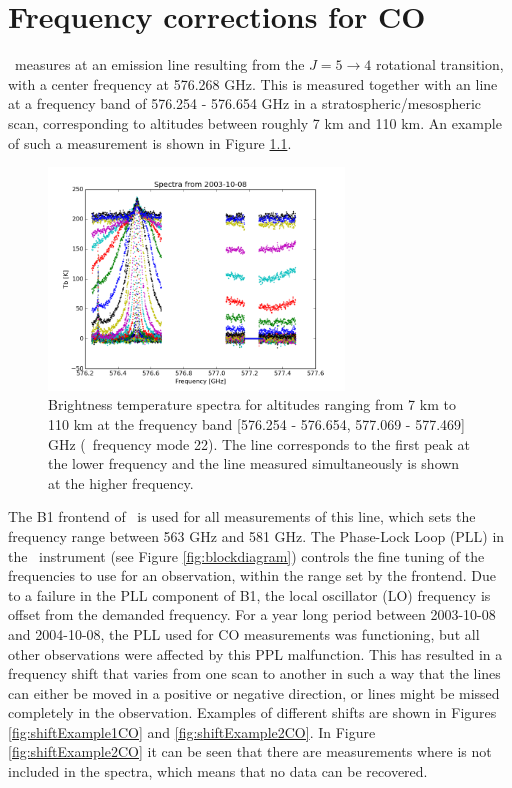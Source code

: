 \chapter{Frequency corrections for CO}
\label{chapter:freqCorrCO}

\smr\ measures  at an emission line resulting from the $J = 5 \rightarrow 4$ rotational transition, with a center frequency at 576.268 GHz. This is measured together with an  line at a frequency band of 576.254 - 576.654 GHz in a stratospheric/mesospheric scan, corresponding to altitudes between roughly 7 km and 110 km. An example of such a measurement is shown in Figure \ref{fig:spectraCO}. 

\begin{figure}[ht!]
\begin{center}
\includegraphics[width=0.7\textwidth]{freq_corr_coExample.png}
\caption{Brightness temperature spectra for altitudes ranging from 7 km to 110 km at the frequency band [576.254 - 576.654, 577.069 - 577.469] GHz (\smr\ frequency mode 22). The  line corresponds to the first peak at the lower frequency and the  line measured simultaneously is shown at the higher frequency.}
\label{fig:spectraCO}
\end{center}
\end{figure}

The B1 frontend of \smr\ is used for all measurements of this  line, which sets the frequency range between 563 GHz and 581 GHz. The Phase-Lock Loop (PLL) in the \smr\ instrument (see Figure \ref{fig:blockdiagram}) controls the fine tuning of the frequencies to use for an observation, within the range set by the frontend. Due to a failure in the PLL component of B1, the local oscillator (LO) frequency is offset from the demanded frequency. For a year long period between 2003-10-08 and 2004-10-08, the PLL used for CO measurements was functioning, but all other observations were affected by this PPL malfunction. This has resulted in a frequency shift that varies from one scan to another in such a way that the lines can either be moved in a positive or negative direction, or lines might be missed completely in the observation. Examples of different shifts are shown in Figures \ref{fig:shiftExample1CO} and \ref{fig:shiftExample2CO}. In Figure \ref{fig:shiftExample2CO} it can be seen that there are measurements where  is not included in the spectra, which means that no data can be recovered.

